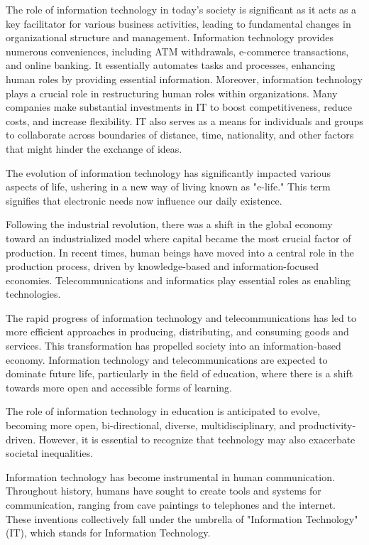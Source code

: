 \documentclass[12pt,titlepage]{article}
\begin{document}
The role of information technology in today's society is significant as it acts as a key facilitator for various business activities, leading to fundamental changes in organizational structure and management. Information technology provides numerous conveniences, including ATM withdrawals, e-commerce transactions, and online banking. It essentially automates tasks and processes, enhancing human roles by providing essential information. Moreover, information technology plays a crucial role in restructuring human roles within organizations. Many companies make substantial investments in IT to boost competitiveness, reduce costs, and increase flexibility. IT also serves as a means for individuals and groups to collaborate across boundaries of distance, time, nationality, and other factors that might hinder the exchange of ideas.

The evolution of information technology has significantly impacted various aspects of life, ushering in a new way of living known as "e-life." This term signifies that electronic needs now influence our daily existence.

Following the industrial revolution, there was a shift in the global economy toward an industrialized model where capital became the most crucial factor of production. In recent times, human beings have moved into a central role in the production process, driven by knowledge-based and information-focused economies. Telecommunications and informatics play essential roles as enabling technologies.

The rapid progress of information technology and telecommunications has led to more efficient approaches in producing, distributing, and consuming goods and services. This transformation has propelled society into an information-based economy. Information technology and telecommunications are expected to dominate future life, particularly in the field of education, where there is a shift towards more open and accessible forms of learning.

The role of information technology in education is anticipated to evolve, becoming more open, bi-directional, diverse, multidisciplinary, and productivity-driven. However, it is essential to recognize that technology may also exacerbate societal inequalities.

Information technology has become instrumental in human communication. Throughout history, humans have sought to create tools and systems for communication, ranging from cave paintings to telephones and the internet. These inventions collectively fall under the umbrella of "Information Technology" (IT), which stands for Information Technology.
\end{document}

